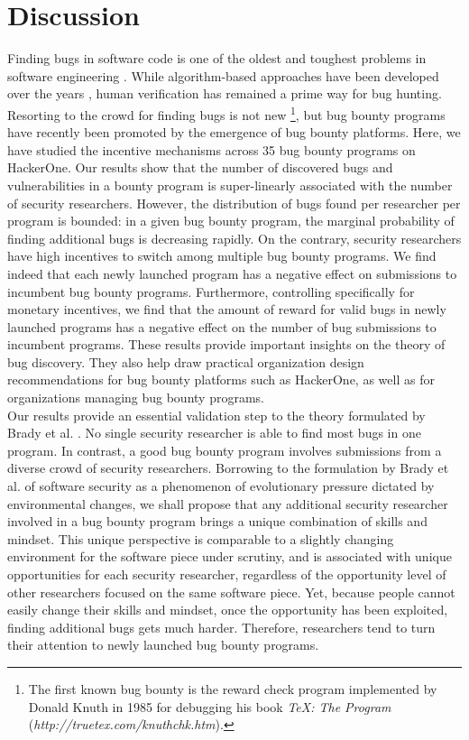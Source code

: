 \section{Discussion}
\label{sec:discussion}
Finding bugs in software code is one of the oldest and toughest problems in software engineering \cite{adams1984textordfeminineoptimizing}. While algorithm-based approaches have been developed over the years \cite{avgerinos2014enhancing}, human verification has remained a prime way for bug hunting. Resorting to the crowd for finding bugs is not new \footnote{The first known bug bounty is the reward check program implemented by Donald Knuth in 1985 for debugging his book {\it TeX: The Program} ({\it http://truetex.com/knuthchk.htm}).}, but bug bounty programs have recently been promoted by the emergence of bug bounty platforms. Here, we have studied the incentive mechanisms across 35 bug bounty programs on HackerOne. Our results show that the number of discovered bugs and vulnerabilities in a bounty program is super-linearly associated with the number of security researchers. However, the distribution of bugs found per researcher per program is bounded: in a given bug bounty program, the marginal probability of finding additional bugs is decreasing rapidly. On the contrary, security researchers have high incentives to switch among multiple bug bounty programs. We find indeed that each newly launched program has a negative effect on submissions to incumbent bug bounty programs. Furthermore, controlling specifically for monetary incentives, we find that the amount of reward for valid bugs in newly launched programs has a negative effect on the number of bug submissions to incumbent programs. These results provide important insights on the theory of bug discovery. They also help draw practical organization design recommendations for bug bounty platforms such as HackerOne, as well as for organizations managing bug bounty programs.\\
 
Our results provide an essential validation step to the theory formulated by Brady et al. \cite{brady1999murphy}. No single security researcher is able to find most bugs in one program. In contrast, a good bug bounty program involves submissions from a diverse crowd of security researchers. Borrowing to the formulation by Brady et al. of software security as a phenomenon of evolutionary pressure dictated by environmental changes, we shall propose that any additional security researcher involved in a bug bounty program brings a unique combination of skills and mindset. This unique perspective is comparable to a slightly changing environment for the software piece under scrutiny, and is associated with unique opportunities for each security researcher, regardless of the opportunity level of other researchers focused on the same software piece. Yet, because people cannot easily change their skills and mindset, once the opportunity has been exploited, finding additional bugs gets much harder. Therefore, researchers tend to turn their attention to newly launched bug bounty programs.\\

